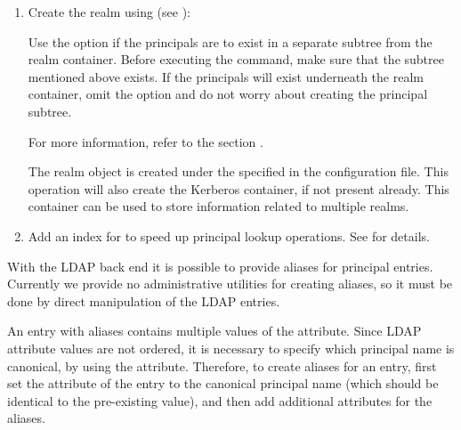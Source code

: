 \documentclass[letterpaper,10pt,english]{sphinxmanual}
\begin{document}
\begin{enumerate}
\item {} 
Create the realm using {\hyperref[\detokenize{admin/admin_commands/kdb5_ldap_util:kdb5-ldap-util-8}]{}} (see
{\hyperref[\detokenize{admin/database:ldap-create-realm}]{}}):

%
\begin{sphinxVerbatim}[commandchars=\\\{\}]
    
\end{sphinxVerbatim}

Use the  option if the principals are to exist in a
separate subtree from the realm container.  Before executing the
command, make sure that the subtree mentioned above
 exists.  If the principals will
exist underneath the realm container, omit the  option
and do not worry about creating the principal subtree.

For more information, refer to the section {\hyperref[\detokenize{admin/database:ops-on-ldap}]{}}.

The realm object is created under the
 specified in the configuration
file.  This operation will also create the Kerberos container, if
not present already.  This container can be used to store
information related to multiple realms.

\item {} 
Add an  index for  to speed up principal
lookup operations.  See
 for
details.

\end{enumerate}

With the LDAP back end it is possible to provide aliases for principal
entries.  Currently we provide no administrative utilities for
creating aliases, so it must be done by direct manipulation of the
LDAP entries.

An entry with aliases contains multiple values of the
 attribute.  Since LDAP attribute values are not
ordered, it is necessary to specify which principal name is canonical,
by using the  attribute.  Therefore, to create
aliases for an entry, first set the  attribute of
the entry to the canonical principal name (which should be identical
to the pre-existing  value), and then add additional
 attributes for the aliases.
\end{document}
